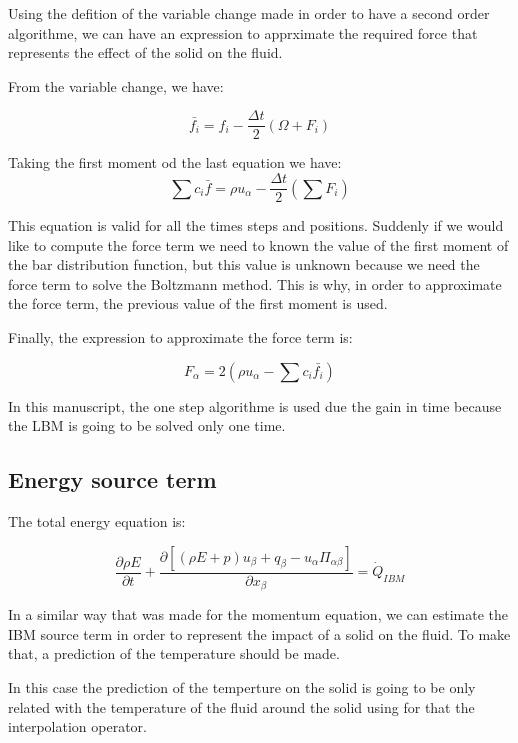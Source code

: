 Using the defition of the variable change made in order to have a second order
algorithme, we can have an expression to apprximate the required force that
represents the effect of the solid on the fluid.

From the variable change, we have:

\begin{equation}
    \bar{f_i} = f_i - \frac{\Delta t}{2}({\Omega + F_i})
\end{equation}

Taking the first moment od the last equation we have:
\begin{equation}
    \sum{c_i\bar{f}} = \rho u_\alpha - \frac{\Delta t}{2}({\sum F_i})
\end{equation}

This equation is valid for all the times steps and positions. Suddenly if we
would like to compute the force term we need to known the value of the first
moment of the bar distribution function, but this value is unknown because we
need the force term to solve the Boltzmann method. This is why, in order to
approximate the force term, the previous value of the first moment is used. 

Finally, the expression to approximate the force term is:

\begin{equation}
    F_\alpha = 2(\rho u_\alpha - \sum {c_i\bar{f_i}})
\end{equation}

In this manuscript, the one step algorithme is used due the gain in time because
the LBM is going to be solved only one time.

\subsection{Energy source term}

The total energy equation is:

\begin{equation}
    \frac{\partial\rho E}{\partial t} + \frac{\partial\left[(\rho E +p)u_\beta + q_\beta - u_\alpha\Pi_{\alpha\beta}\right]}{\partial x_\beta} = \dot{Q}_{IBM}
\end{equation}

In a similar way that was made for the momentum equation, we can estimate the
IBM source term in order to represent the impact of a solid on the fluid. To
make that, a prediction of the temperature should be made. 

In this case the prediction of the temperture on the solid is going to be only
related with the temperature of the fluid around the solid using for that the
interpolation operator.

